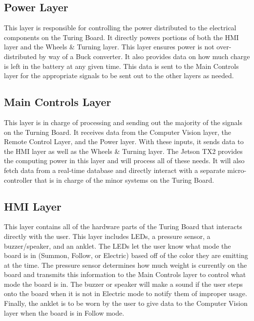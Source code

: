 \subsection{Power Layer}
This layer is responsible for controlling the power distributed to the electrical components on the Turing Board. It directly powers portions of both the HMI layer and the Wheels \& Turning layer. This layer ensures power is not over-distributed by way of a Buck converter. It also provides data on how much charge is left in the battery at any given time. This data is sent to the Main Controls layer for the appropriate signals to be sent out to the other layers as needed.

\subsection{Main Controls Layer}
This layer is in charge of processing and sending out the majority of the signals on the Turning Board. It receives data from the Computer Vision layer, the Remote Control Layer, and the Power layer. With these inputs, it sends data to the HMI layer as well as the Wheels \& Turning layer. The Jetson TX2 provides the computing power in this layer and will process all of these needs. It will also fetch data from a real-time database and directly interact with a separate micro-controller that is in charge of the minor systems on the Turing Board.

\subsection{HMI Layer}
This layer contains all of the hardware parts of the Turing Board that interacts directly with the user. This layer includes LEDs, a pressure sensor, a buzzer/speaker, and an anklet. The LEDs let the user know what mode the board is in (Summon, Follow, or Electric) based off of the color they are emitting at the time. The pressure sensor determines how much weight is currently on the board and transmits this information to the Main Controls layer to control what mode the board is in. The buzzer or speaker will make a sound if the user steps onto the board when it is not in Electric mode to notify them of improper usage. Finally, the anklet is to be worn by the user to give data to the Computer Vision layer when the board is in Follow mode.

